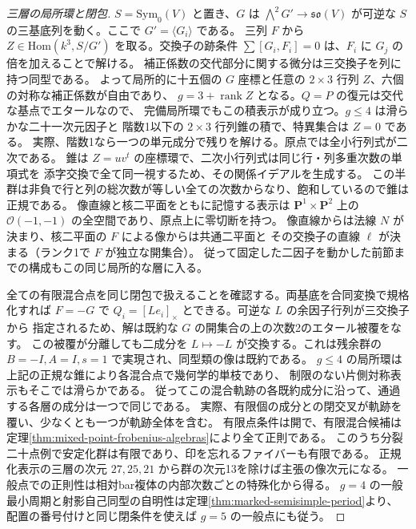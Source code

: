 \begin{proof}[三層の局所環と閉包]
$S=\mathrm{Sym}_0(V)$ と置き、$G$ は $\bigwedge^2 G'\to\mathfrak{so}(V)$ が可逆な
$S$ の三基底列を動く。ここで $G'=\langle G_i\rangle$ である。
三列 $F$ から $Z\in\mathrm{Hom}(k^3,S/G')$ を取る。交換子の跡条件
$\sum[G_i,F_i]=0$ は、$F_i$ に $G_j$ の倍を加えることで解ける。
補正係数の交代部分に関する微分は三交換子を列に持つ同型である。
よって局所的に十五個の $G$ 座標と任意の $2\times3$ 行列 $Z$、六個の対称な補正係数が自由であり、
$g=3+\operatorname{rank}Z$ となる。$Q=P$ の復元は交代な基点でエタールなので、
完備局所環でもこの積表示が成り立つ。$g\le4$ は滑らかな二十一次元因子と
階数1以下の $2\times3$ 行列錐の積で、特異集合は $Z=0$ である。
実際、階数1なら一つの単元成分で残りを解ける。原点では全小行列式が二次である。
錐は $Z=u v^t$ の座標環で、二次小行列式は同じ行・列多重次数の単項式を
添字交換で全て同一視するため、その関係イデアルを生成する。
この半群は非負で行と列の総次数が等しい全ての次数からなり、飽和しているので錐は正規である。
像直線と核二平面をともに記憶する表示は $\mathbf P^1\times\mathbf P^2$ 上の
$\mathcal O(-1,-1)$ の全空間であり、原点上に零切断を持つ。
像直線からは法線 $N$ が決まり、核二平面の $F$ による像からは共通二平面と
その交換子の直線 $\ell$ が決まる（ランク1で $F$ が独立な開集合）。
従って固定した二因子を動かした前節までの構成もこの同じ局所的な層に入る。

全ての有限混合点を同じ閉包で扱えることを確認する。両基底を合同変換で規格化すれば
$F=-G$ で $Q_i=[Le_i]_\times$ とできる。可逆な $L$ の余因子行列が三交換子から
指定されるため、解は既約な $G$ の開集合の上の次数2のエタール被覆をなす。
この被覆が分離しても二成分を $L\mapsto-L$ が交換する。これは残余群の
$B=-I,A=I,s=1$ で実現され、同型類の像は既約である。
$g\le4$ の局所環は上記の正規な錐により各混合点で幾何学的単枝であり、
制限のない片側対称表示もそこでは滑らかである。
従ってこの混合軌跡の各既約成分に沿って、通過する各層の成分は一つで同じである。
実際、有限個の成分との閉交叉が軌跡を覆い、少なくとも一つが軌跡全体を含む。
有限点条件は開で、有限混合候補は定理\ref{thm:mixed-point-frobenius-algebras}により全て正則である。
このうち分裂二十点例で安定化群は有限であり、印を忘れるファイバーも有限である。
正規化表示の三層の次元 $27,25,21$ から群の次元13を除けば主張の像次元になる。
一般点での正則性は相対bar複体の内部次数ごとの特殊化から得る。
$g=4$ の一般最小周期と射影自己同型の自明性は定理\ref{thm:marked-semisimple-period}より、
配置の番号付けと同じ閉条件を使えば $g=5$ の一般点にも従う。
\end{proof}

